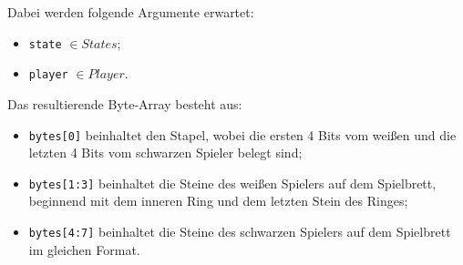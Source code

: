\documentclass[11pt]{article}
\providecommand{\tightlist}{%
      \setlength{\itemsep}{0pt}\setlength{\parskip}{0pt}}
\begin{document}
Dabei werden folgende Argumente erwartet:

\begin{itemize}
    \tightlist
    \item \texttt{state} \(\in States\);
    \item \texttt{player} \(\in Player\).
\end{itemize}

Das resultierende Byte-Array besteht aus:

\begin{itemize}
    \tightlist
    \item \texttt{bytes{[}0{]}}
    beinhaltet den Stapel, wobei die ersten 4 Bits vom weißen und die
    letzten 4 Bits vom schwarzen Spieler belegt sind;
    \item \texttt{bytes{[}1:3{]}} beinhaltet die Steine des weißen Spielers auf
    dem Spielbrett, beginnend mit dem inneren Ring und dem letzten Stein des
    Ringes;
    \item \texttt{bytes{[}4:7{]}} beinhaltet die Steine des schwarzen
    Spielers auf dem Spielbrett im gleichen Format.
\end{itemize}
\end{document}

